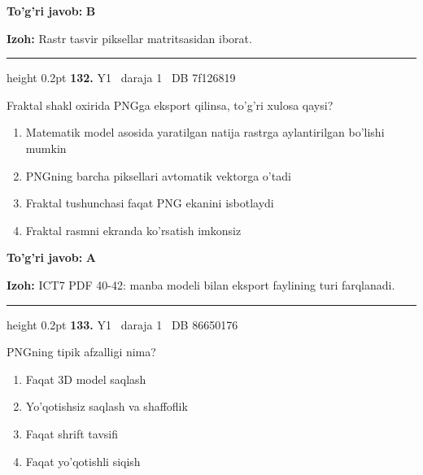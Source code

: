 \documentclass[10pt,a4paper,oneside]{article}
\begin{document}
\begin{tcolorbox}[enhanced,breakable,colback=teal!4,colframe=teal!45!black,boxrule=0.45pt,arc=1.2mm,left=2.8mm,right=2.8mm,top=2mm,bottom=2mm,before skip=2mm,after skip=2mm]
\textbf{\color{teal}To'g'ri javob:} \textbf{B}
\par\smallskip
\textbf{Izoh:} Rastr tasvir piksellar matritsasidan iborat.
\end{tcolorbox}
\vspace{2mm}\hrule height 0.2pt \vspace{4mm}
\hypertarget{q132}{\textbf{\color{ink}132.}}  {\color{muted}\scriptsize Y1 \textbullet\ daraja 1 \textbullet\ DB 7f126819}
\par
Fraktal shakl oxirida PNGga eksport qilinsa, to'g'ri xulosa qaysi?
\begin{enumerate}[label=\Alph*),leftmargin=9mm]
\item Matematik model asosida yaratilgan natija rastrga aylantirilgan bo'lishi mumkin
\item PNGning barcha piksellari avtomatik vektorga o'tadi
\item Fraktal tushunchasi faqat PNG ekanini isbotlaydi
\item Fraktal rasmni ekranda ko'rsatish imkonsiz
\end{enumerate}
\begin{tcolorbox}[enhanced,breakable,colback=teal!4,colframe=teal!45!black,boxrule=0.45pt,arc=1.2mm,left=2.8mm,right=2.8mm,top=2mm,bottom=2mm,before skip=2mm,after skip=2mm]
\textbf{\color{teal}To'g'ri javob:} \textbf{A}
\par\smallskip
\textbf{Izoh:} ICT7 PDF 40-42: manba modeli bilan eksport faylining turi farqlanadi.
\end{tcolorbox}
\vspace{2mm}\hrule height 0.2pt \vspace{4mm}
\hypertarget{q133}{\textbf{\color{ink}133.}}  {\color{muted}\scriptsize Y1 \textbullet\ daraja 1 \textbullet\ DB 86650176}
\par
PNGning tipik afzalligi nima?
\begin{enumerate}[label=\Alph*),leftmargin=9mm]
\item Faqat 3D model saqlash
\item Yo'qotishsiz saqlash va shaffoflik
\item Faqat shrift tavsifi
\item Faqat yo'qotishli siqish
\end{enumerate}
\end{document}
